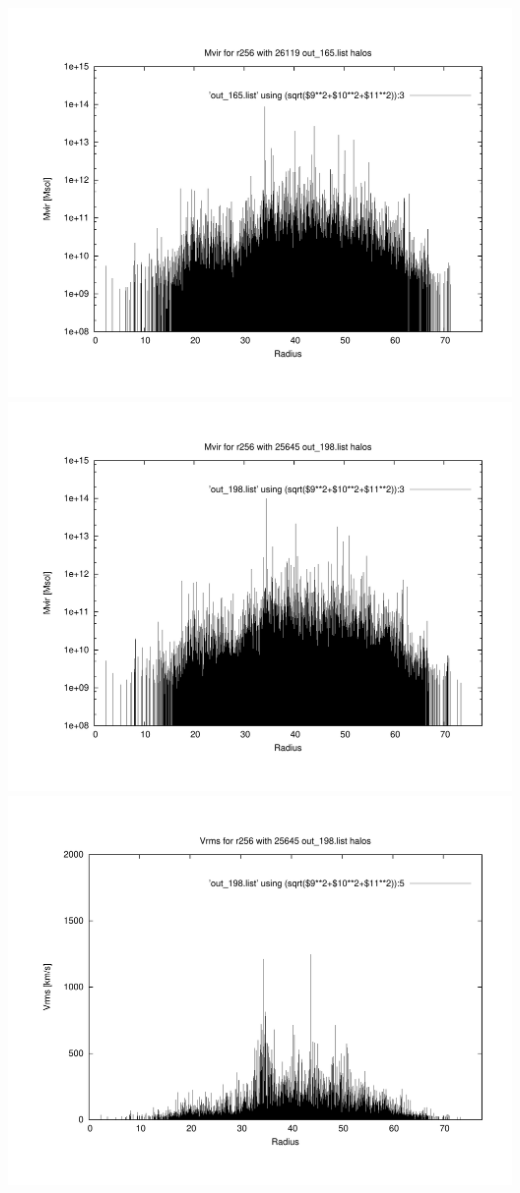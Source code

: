 \includegraphics[scale=0.3]{r256/h100/stages_52/plot_mvir_out_165.pdf}
\includegraphics[scale=0.3]{r256/h100/stages_52/plot_mvir_out_198.pdf}
\includegraphics[scale=0.3]{r256/h100/stages_52/plot_Vrms_out_198.pdf}
